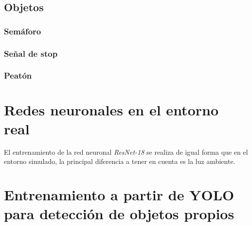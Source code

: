 \subsection{Objetos}

\subsubsection{Semáforo}

\subsubsection{Señal de stop}

\subsubsection{Peatón}

\section{Redes neuronales en el entorno real}
El entrenamiento de la red neuronal \textit{ResNet-18} se realiza de igual forma que en el entorno simulado, la principal diferencia a tener en cuenta es la luz ambiente.


\section{Entrenamiento a partir de YOLO para detección de objetos propios}

